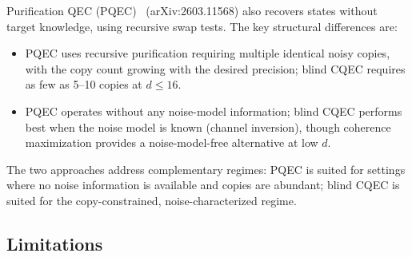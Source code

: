 \documentclass[prx,twocolumn,superscriptaddress,longbibliography,floatfix]{revtex4-2}
\begin{document}
Purification QEC (PQEC)~\cite{Raghoonanan2026} (arXiv:2603.11568) also recovers states without target knowledge, using recursive swap tests.
The key structural differences are:
\begin{itemize}
\item PQEC uses recursive purification requiring multiple identical noisy copies, with the copy count growing with the desired precision;
blind CQEC requires as few as 5--10 copies at $d \leq 16$.
\item PQEC operates without any noise-model information;
blind CQEC performs best when the noise model is known (channel inversion), though coherence maximization provides a noise-model-free alternative at low $d$.
\end{itemize}
The two approaches address complementary regimes: PQEC is suited for settings where no noise information is available and copies are abundant; blind CQEC is suited for the copy-constrained, noise-characterized regime.


\subsection{Limitations}
\label{sec:limitations}
\end{document}
